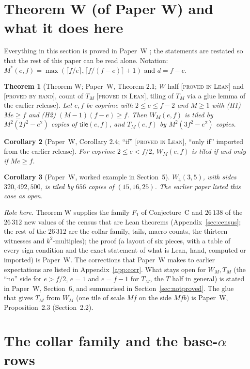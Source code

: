 \documentclass[11pt,reqno]{amsart}
\theoremstyle{plain}
\newtheorem{theorem}{Theorem}[section]
\newtheorem{corollary}[theorem]{Corollary}
\theoremstyle{definition}
\newcommand{\lab}[1]{\textup{[\textsc{#1}]}}
\newcommand{\PL}{\lab{proved in Lean}}
\newcommand{\PH}{\lab{proved by hand}}
\newcommand{\tile}{\mathsf{tile}}
\begin{document}
\section{Theorem W (of Paper W) and what it does here}\label{sec:thmW}
Everything in this section is proved in Paper~W \cite{PaperW}; the statements are restated so that the rest of this paper can be read alone. Notation: $M^*(e,f)=\max(\lceil f/e\rceil,\lceil f/(f-e)\rceil+1)$ and $d=f-e$.
\begin{theorem}[Theorem W; Paper~W, Theorem 2.1; $W$ half \PL{} and \PH{}, count of $T_M$ \PL{}, tiling of $T_M$ via a glue lemma of the earlier release]\label{thm:W}
Let $e,f$ be coprime with $2\le e\le f-2$ and $M\ge1$ with (H1) $Me\ge f$ and (H2) $(M-1)(f-e)\ge f$. Then $W_M(e,f)$ is tiled by $M^2(2f^2-e^2)$ copies of $\tile(e,f)$, and $T_M(e,f)$ by $M^2(3f^2-e^2)$ copies.
\end{theorem}
\begin{corollary}[Paper~W, Corollary 2.4; ``if'' \PL{}, ``only if'' imported from the earlier release]\label{cor:sharp}
For coprime $2\le e<f/2$, $W_M(e,f)$ is tiled if and only if $Me\ge f$.
\end{corollary}
\begin{corollary}[Paper~W, worked example in Section~5]\label{cor:W435}
$W_4(3,5)$, with sides $320,492,500$, is tiled by $656$ copies of $(15,16,25)$. The earlier paper listed this case as open.
\end{corollary}
\emph{Role here.} Theorem W supplies the family $F_1$ of Conjecture~C and $26\,138$ of the $26\,312$ new values of the census that are Lean theorems (Appendix~\ref{sec:census}; the rest of the $26\,312$ are the collar family, tails, macro counts, the thirteen witnesses and $k^2$-multiples); the proof (a layout of six pieces, with a table of every sign condition and the exact statement of what is Lean, hand, computed or imported) is Paper~W. The corrections that Paper~W makes to earlier expectations are listed in Appendix~\ref{app:corr}. What stays open for $W_M,T_M$ (the ``no'' side for $e>f/2$, $e=1$ and $e=f-1$ for $T_M$, the $T$ half in general) is stated in Paper~W, Section~6, and summarised in Section~\ref{sec:notproved}. The glue that gives $T_M$ from $W_M$ (one tile of scale $Mf$ on the side $Mfb$) is Paper~W, Proposition~2.3 (Section~2.2).

\section{The collar family and the base-$\alpha$ rows}\label{sec:collar}
\end{document}
